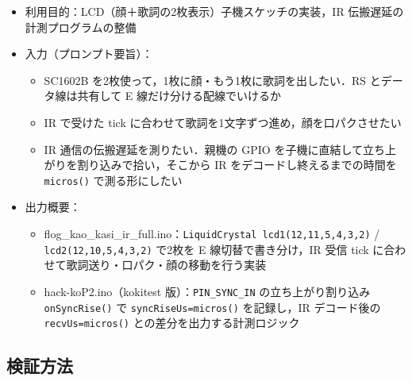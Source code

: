 \documentclass[a4paper,11pt]{ltjsarticle}
\providecommand{\％}{\%}
\begin{document}
\begin{itemize}
    \item 利用目的：LCD（顔＋歌詞の2枚表示）子機スケッチの実装，IR 伝搬遅延の計測プログラムの整備
    \item 入力（プロンプト要旨）：
    \begin{itemize}
        \item SC1602B を2枚使って，1枚に顔・もう1枚に歌詞を出したい．RS とデータ線は共有して E 線だけ分ける配線でいけるか
        \item IR で受けた tick に合わせて歌詞を1文字ずつ進め，顔を口パクさせたい
        \item IR 通信の伝搬遅延を測りたい．親機の GPIO を子機に直結して立ち上がりを割り込みで拾い，そこから IR をデコードし終えるまでの時間を \texttt{micros()} で測る形にしたい
    \end{itemize}
    \item 出力概要：
    \begin{itemize}
        \item flog\_kao\_kasi\_ir\_full.ino：\texttt{LiquidCrystal lcd1(12,11,5,4,3,2)} / \texttt{lcd2(12,10,5,4,3,2)} で2枚を E 線切替で書き分け，IR 受信 tick に合わせて歌詞送り・口パク・顔の移動を行う実装
        \item hack-koP2.ino（kokitest 版）：\texttt{PIN\_SYNC\_IN} の立ち上がり割り込み \texttt{onSyncRise()} で \texttt{syncRiseUs=micros()} を記録し，IR デコード後の \texttt{recvUs=micros()} との差分を出力する計測ロジック
    \end{itemize}
\end{itemize}

\subsection{検証方法}\label{sec:ai-verify}
\end{document}
